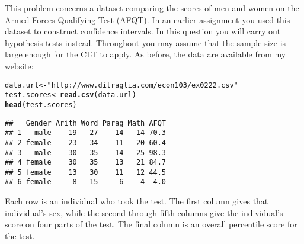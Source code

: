 \documentclass[addpoints,12pt]{exam}\usepackage[]{graphicx}\usepackage[]{color}
\makeatletter
\newcommand{\hlstr}[1]{\textcolor[rgb]{0.192,0.494,0.8}{#1}}%
\newcommand{\hlstd}[1]{\textcolor[rgb]{0.345,0.345,0.345}{#1}}%
\newcommand{\hlkwb}[1]{\textcolor[rgb]{0.69,0.353,0.396}{#1}}%
\newcommand{\hlkwd}[1]{\textcolor[rgb]{0.737,0.353,0.396}{\textbf{#1}}}%
\newenvironment{kframe}{%
 \def\at@end@of@kframe{}%
 \ifinner\ifhmode%
  \def\at@end@of@kframe{\end{minipage}}%
  \begin{minipage}{\columnwidth}%
 \fi\fi%
 \def\FrameCommand##1{\hskip\@totalleftmargin \hskip-\fboxsep
 \colorbox{shadecolor}{##1}\hskip-\fboxsep
     \hskip-\linewidth \hskip-\@totalleftmargin \hskip\columnwidth}%
 \MakeFramed {\advance\hsize-\width
   \@totalleftmargin\z@ \linewidth\hsize
   \@setminipage}}%
 {\par\unskip\endMakeFramed%
 \at@end@of@kframe}
\newenvironment{knitrout}{}{} %
\makeatother
\begin{document}
\begin{questions}
\question This problem concerns a dataset comparing the scores of men and women on the Armed Forces Qualifying Test (AFQT). In an earlier assignment you used this dataset to construct confidence intervals. In this question you will carry out hypothesis tests instead. Throughout you may assume that the sample size is large enough for the CLT to apply. As before, the data are available from my website:
\begin{knitrout}
\color{fgcolor}\begin{kframe}
\begin{alltt}
\hlstd{data.url} \hlkwb{<-} \hlstr{"http://www.ditraglia.com/econ103/ex0222.csv"}
\hlstd{test.scores} \hlkwb{<-} \hlkwd{read.csv}\hlstd{(data.url)}
\hlkwd{head}\hlstd{(test.scores)}
\end{alltt}
\begin{verbatim}
##   Gender Arith Word Parag Math AFQT
## 1   male    19   27    14   14 70.3
## 2 female    23   34    11   20 60.4
## 3   male    30   35    14   25 98.3
## 4 female    30   35    13   21 84.7
## 5 female    13   30    11   12 44.5
## 6 female     8   15     6    4  4.0
\end{verbatim}
\end{kframe}
\end{knitrout}
Each row is an individual who took the test. The first column gives that individual's sex, while the second through fifth columns give the individual's score on four parts of the test. The final column is an overall percentile score for the test. 
	\begin{parts}

\end{parts}
\end{questions}
\end{document}
